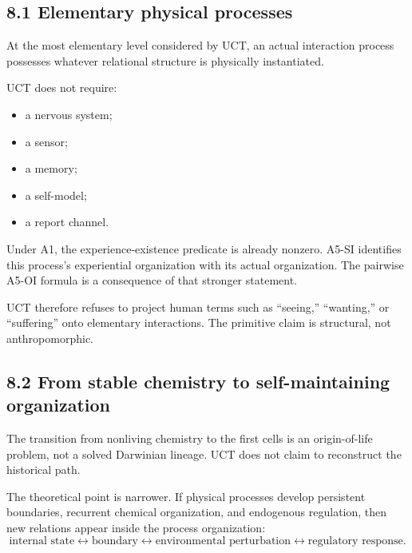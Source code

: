 \documentclass[
  11pt,
  a4paper,
]{article}
\providecommand{\tightlist}{%
  \setlength{\itemsep}{0pt}\setlength{\parskip}{0pt}}
\begin{document}
\hypertarget{elementary-physical-processes}{%
\subsection{8.1 Elementary physical
processes}\label{elementary-physical-processes}}

At the most elementary level considered by UCT, an actual interaction
process possesses whatever relational structure is physically
instantiated.

UCT does not require:

\begin{itemize}
\tightlist
\item
  a nervous system;
\item
  a sensor;
\item
  a memory;
\item
  a self-model;
\item
  a report channel.
\end{itemize}

Under A1, the experience-existence predicate is already nonzero. A5-SI
identifies this process's experiential organization with its actual
organization. The pairwise A5-OI formula is a consequence of that
stronger statement.

UCT therefore refuses to project human terms such as ``seeing,''
``wanting,'' or ``suffering'' onto elementary interactions. The
primitive claim is structural, not anthropomorphic.

\hypertarget{from-stable-chemistry-to-self-maintaining-organization}{%
\subsection{8.2 From stable chemistry to self-maintaining
organization}\label{from-stable-chemistry-to-self-maintaining-organization}}

The transition from nonliving chemistry to the first cells is an
origin-of-life problem, not a solved Darwinian lineage. UCT does not
claim to reconstruct the historical path.

The theoretical point is narrower. If physical processes develop
persistent boundaries, recurrent chemical organization, and endogenous
regulation, then new relations appear inside the process organization:
\nopagebreak[4]
\[
\text{internal state}
\leftrightarrow
\text{boundary}
\leftrightarrow
\text{environmental perturbation}
\leftrightarrow
\text{regulatory response}.
\]
\end{document}
